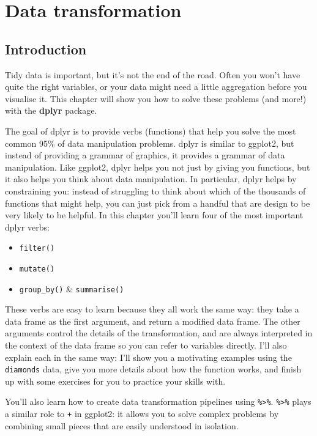 \chapter{Data transformation}\label{cha:dplyr}

\section{Introduction}

Tidy data is important, but it's not the end of the road. Often you
won't have quite the right variables, or your data might need a little
aggregation before you visualise it. This chapter will show you how to
solve these problems (and more!) with the \textbf{dplyr} package.
 

The goal of dplyr is to provide verbs (functions) that help you solve
the most common 95\% of data manipulation problems. dplyr is similar to
ggplot2, but instead of providing a grammar of graphics, it provides a
grammar of data manipulation. Like ggplot2, dplyr helps you not just by
giving you functions, but it also helps you think about data
manipulation. In particular, dplyr helps by constraining you: instead of
struggling to think about which of the thousands of functions that might
help, you can just pick from a handful that are design to be very likely
to be helpful. In this chapter you'll learn four of the most important
dplyr verbs:

\begin{itemize}
\tightlist
\item
  \texttt{filter()}
\item
  \texttt{mutate()}
\item
  \texttt{group\_by()} \& \texttt{summarise()}
\end{itemize}

These verbs are easy to learn because they all work the same way: they
take a data frame as the first argument, and return a modified data
frame. The other arguments control the details of the transformation,
and are always interpreted in the context of the data frame so you can
refer to variables directly. I'll also explain each in the same way:
I'll show you a motivating examples using the \texttt{diamonds} data,
give you more details about how the function works, and finish up with
some exercises for you to practice your skills with.

You'll also learn how to create data transformation pipelines using
\texttt{\%\textgreater{}\%}. \texttt{\%\textgreater{}\%} plays a similar
role to \texttt{+} in ggplot2: it allows you to solve complex problems
by combining small pieces that are easily understood in isolation.

